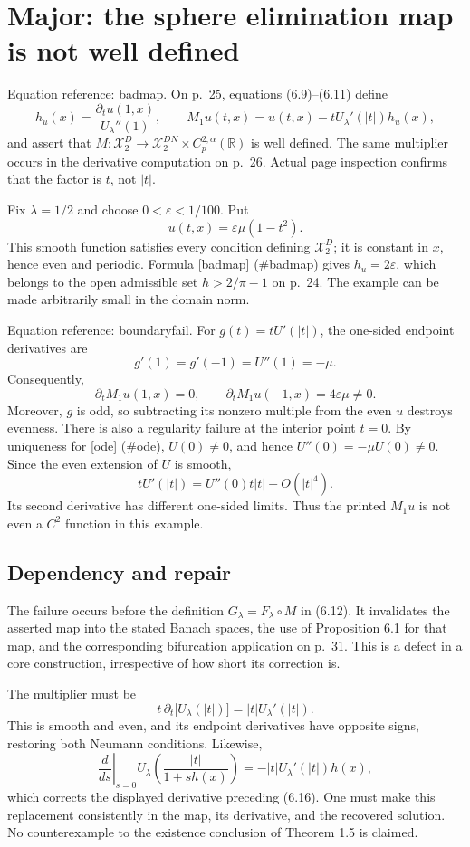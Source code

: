 \documentclass[10pt]{article}
\begin{document}
\section*{Major: the sphere elimination map is not well defined}
Equation reference: badmap. On p. 25, equations (6.9)–(6.11) define \[
h_u(x)=\frac{\partial_tu(1,x)}{U_\lambda''(1)},\qquad
M_1u(t,x)=u(t,x)-tU_\lambda'(|t|)h_u(x),\] and assert that \(M:\mathcal X_2^D\to\mathcal X_2^{DN}\times C_p^{2,\alpha}(\mathbb R)\) is well defined. The same multiplier occurs in the derivative computation on p. 26. Actual page inspection confirms that the factor is \(t\), not \(|t|\).\par
Fix \(\lambda=1/2\) and choose \(0<\varepsilon<1/100\). Put \[u(t,x)=\varepsilon\mu(1-t^2).\] This smooth function satisfies every condition defining \(\mathcal X_2^D\); it is constant in \(x\), hence even and periodic. Formula [badmap] (\#badmap) gives \(h_u=2\varepsilon\), which belongs to the open admissible set \(h>2/\pi-1\) on p. 24. The example can be made arbitrarily small in the domain norm.\par
Equation reference: boundaryfail. For \(g(t)=tU'(|t|)\), the one-sided endpoint derivatives are \[g'(1)=g'(-1)=U''(1)=-\mu.\] Consequently, \[
\partial_tM_1u(1,x)=0,\qquad
\partial_tM_1u(-1,x)=4\varepsilon\mu\ne0.\] Moreover, \(g\) is odd, so subtracting its nonzero multiple from the even \(u\) destroys evenness. There is also a regularity failure at the interior point \(t=0\). By uniqueness for [ode] (\#ode), \(U(0)\ne0\), and hence \(U''(0)=-\mu U(0)\ne0\). Since the even extension of \(U\) is smooth, \[tU'(|t|)=U''(0)t|t|+O(|t|^4).\] Its second derivative has different one-sided limits. Thus the printed \(M_1u\) is not even a \(C^2\) function in this example.\par
\subsection*{Dependency and repair}
The failure occurs before the definition \(G_\lambda=F_\lambda\circ M\) in (6.12). It invalidates the asserted map into the stated Banach spaces, the use of Proposition 6.1 for that map, and the corresponding bifurcation application on p. 31. This is a defect in a core construction, irrespective of how short its correction is.\par
The multiplier must be \[t\,\partial_t\bigl[U_\lambda(|t|)\bigr]
   =|t|U_\lambda'(|t|).\] This is smooth and even, and its endpoint derivatives have opposite signs, restoring both Neumann conditions. Likewise, \[\left.\frac{d}{ds}\right|_{s=0}
 U_\lambda\!\left(\frac{|t|}{1+sh(x)}\right)
 =-|t|U_\lambda'(|t|)h(x),\] which corrects the displayed derivative preceding (6.16). One must make this replacement consistently in the map, its derivative, and the recovered solution. No counterexample to the existence conclusion of Theorem 1.5 is claimed.\par
\end{document}
